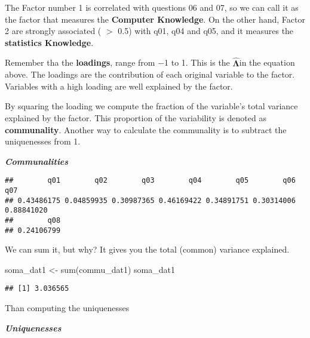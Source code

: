 \documentclass[
]{article}
\newenvironment{Shaded}{\begin{snugshade}}{\end{snugshade}}
\newcommand{\DecValTok}[1]{\textcolor[rgb]{0.00,0.00,0.81}{#1}}
\newcommand{\FunctionTok}[1]{\textcolor[rgb]{0.00,0.00,0.00}{#1}}
\newcommand{\NormalTok}[1]{#1}
\newcommand{\OtherTok}[1]{\textcolor[rgb]{0.56,0.35,0.01}{#1}}
\newcommand{\SpecialCharTok}[1]{\textcolor[rgb]{0.00,0.00,0.00}{#1}}
\begin{document}
The Factor number 1 is correlated with questions 06 and 07, so we can
call it as the factor that measures the \textbf{Computer Knowledge}. On
the other hand, Factor 2 are strongly associated ( \(>\) 0.5) with q01,
q04 and q05, and it measures the \textbf{statistics Knowledge}.

Remember tha the \textbf{loadings}, range from −1 to 1. This is the
\(\mathbf{\hat{\Lambda}}\)in the equation above. The loadings are the
contribution of each original variable to the factor. Variables with a
high loading are well explained by the factor.

By squaring the loading we compute the fraction of the variable's total
variance explained by the factor. This proportion of the variability is
denoted as \textbf{communality}. Another way to calculate the
communality is to subtract the uniquenesses from 1.

\textbf{\emph{Communalities}}

\begin{Shaded}
\end{Shaded}

\begin{verbatim}
##        q01        q02        q03        q04        q05        q06        q07 
## 0.43486175 0.04859935 0.30987365 0.46169422 0.34891751 0.30314006 0.88841020 
##        q08 
## 0.24106799
\end{verbatim}

We can sum it, but why? It gives you the total (common) variance
explained.

\begin{Shaded}
\begin{Highlighting}[]
\NormalTok{soma\_dat1 }\OtherTok{\textless{}{-}} \FunctionTok{sum}\NormalTok{(commu\_dat1)}
\NormalTok{soma\_dat1}
\end{Highlighting}
\end{Shaded}

\begin{verbatim}
## [1] 3.036565
\end{verbatim}

Than computing the uniquenesses

\textbf{\emph{Uniquenesses}}
\end{document}
